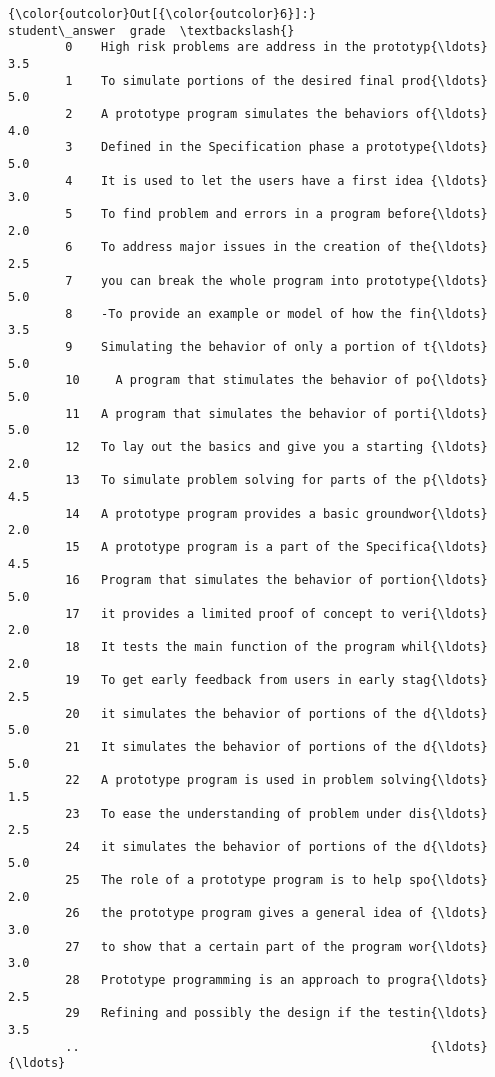 \documentclass[11pt]{article}
\begin{document}
\begin{Verbatim}[commandchars=\\\{\}]
{\color{outcolor}Out[{\color{outcolor}6}]:}                                         student\_answer  grade  \textbackslash{}
        0    High risk problems are address in the prototyp{\ldots}    3.5   
        1    To simulate portions of the desired final prod{\ldots}    5.0   
        2    A prototype program simulates the behaviors of{\ldots}    4.0   
        3    Defined in the Specification phase a prototype{\ldots}    5.0   
        4    It is used to let the users have a first idea {\ldots}    3.0   
        5    To find problem and errors in a program before{\ldots}    2.0   
        6    To address major issues in the creation of the{\ldots}    2.5   
        7    you can break the whole program into prototype{\ldots}    5.0   
        8    -To provide an example or model of how the fin{\ldots}    3.5   
        9    Simulating the behavior of only a portion of t{\ldots}    5.0   
        10     A program that stimulates the behavior of po{\ldots}    5.0   
        11   A program that simulates the behavior of porti{\ldots}    5.0   
        12   To lay out the basics and give you a starting {\ldots}    2.0   
        13   To simulate problem solving for parts of the p{\ldots}    4.5   
        14   A prototype program provides a basic groundwor{\ldots}    2.0   
        15   A prototype program is a part of the Specifica{\ldots}    4.5   
        16   Program that simulates the behavior of portion{\ldots}    5.0   
        17   it provides a limited proof of concept to veri{\ldots}    2.0   
        18   It tests the main function of the program whil{\ldots}    2.0   
        19   To get early feedback from users in early stag{\ldots}    2.5   
        20   it simulates the behavior of portions of the d{\ldots}    5.0   
        21   It simulates the behavior of portions of the d{\ldots}    5.0   
        22   A prototype program is used in problem solving{\ldots}    1.5   
        23   To ease the understanding of problem under dis{\ldots}    2.5   
        24   it simulates the behavior of portions of the d{\ldots}    5.0   
        25   The role of a prototype program is to help spo{\ldots}    2.0   
        26   the prototype program gives a general idea of {\ldots}    3.0   
        27   to show that a certain part of the program wor{\ldots}    3.0   
        28   Prototype programming is an approach to progra{\ldots}    2.5   
        29   Refining and possibly the design if the testin{\ldots}    3.5   
        ..                                                 {\ldots}    {\ldots}   

\end{Verbatim}
\end{document}
